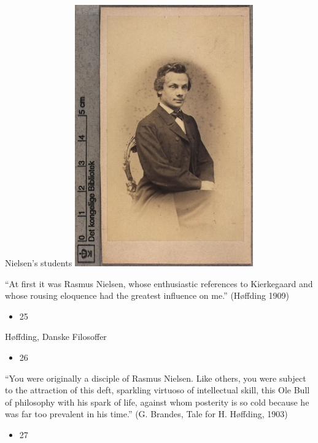 \documentclass{beamer}
\begin{document}
\begin{frame}{Nielsen’s students}
\includegraphics[width=0.9\linewidth]{slide24_img9.jpg}
\end{frame}
\begin{frame}{“At first it was Rasmus Nielsen, whose enthusiastic references to Kierkegaard and whose rousing eloquence had the greatest influence on me.” (Høffding 1909)}
\begin{itemize}
  \item 25
\end{itemize}
\end{frame}
\begin{frame}{Høffding, Danske Filosoffer}
\begin{itemize}
  \item 26
\end{itemize}
\end{frame}
\begin{frame}{“You were originally a disciple of Rasmus Nielsen. Like others, you were subject to the attraction of this deft, sparkling virtuoso of intellectual skill, this Ole Bull of philosophy with his spark of life, against whom posterity is so cold because he was far too prevalent in his time.” 
(G. Brandes, Tale for H. Høffding, 1903)}
\begin{itemize}
  \item 27
\end{itemize}
\end{frame}
\end{document}
